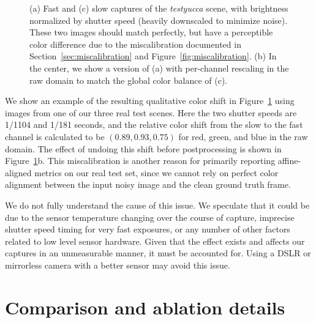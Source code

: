 \begin{figure}
    \centering
{}
    \caption{(a) Fast and (c) slow captures of the \emph{testyucca} scene, with brightness normalized by shutter speed (heavily downscaled to minimize noise). These two images should match perfectly, but have a perceptible color difference due to the miscalibration documented in Section~\ref{sec:miscalibration} and Figure~\ref{fig:miscalibration}. (b) In the center, we show a version of (a) with per-channel rescaling in the raw domain to match the global color balance of (c).}
    \label{fig:yucca_wb}
\end{figure}

We show an example of the resulting qualitative color shift in Figure~\ref{fig:yucca_wb} using images from one of our three real test scenes. Here the two shutter speeds are 1/1104 and 1/181 seconds, and the relative color shift from the slow to the fast channel is calculated to be $(0.89, 0.93, 0.75)$ for red, green, and blue in the raw domain. The effect of undoing this shift before postprocessing is shown in Figure~\ref{fig:yucca_wb}b. This miscalibration is another reason for primarily reporting affine-aligned metrics on our real test set, since we cannot rely on perfect color alignment between the input noisy image and the clean ground truth frame.

We do not fully understand the cause of this issue. We speculate that it could be due to the sensor temperature changing over the course of capture, imprecise shutter speed timing for very fast exposures, or any number of other factors related to low level sensor hardware. Given that the effect exists and affects our captures in an unmeasurable manner, it must be accounted for. Using a DSLR or mirrorless camera with a better sensor may avoid this issue.



\section{Comparison and ablation details}



